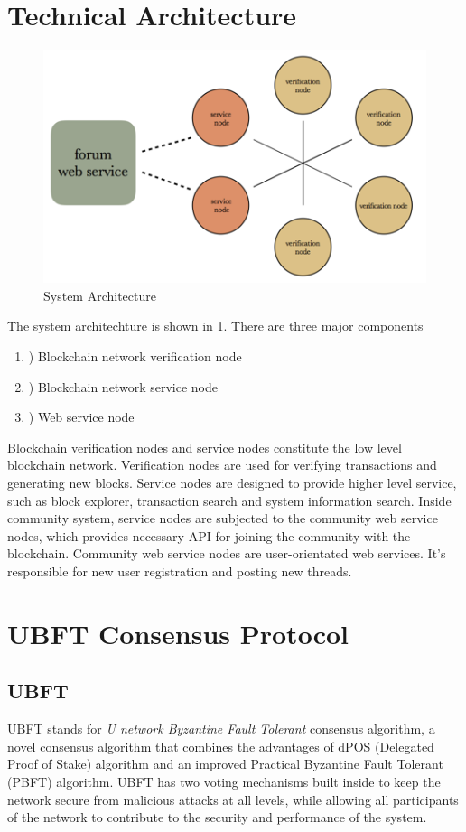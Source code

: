 \section{Technical Architecture}
\begin{figure}
\centering
\includegraphics[width=0.8 \linewidth]{Network.png}
\caption{System Architecture}
\label{fig:system_architecture}
\end{figure}
The system architechture is shown in \ref{fig:system_architecture}. There are three major components
\begin{enumerate}
    \item ) Blockchain network verification node
    \item ) Blockchain network service node
    \item ) Web service node
\end{enumerate}
	
    Blockchain verification nodes and service nodes constitute the low level blockchain network. Verification nodes are used for verifying transactions and generating new blocks. Service nodes are designed to provide higher level service, such as block explorer, transaction search and system information search. Inside community system, service nodes are subjected to the community web service nodes, which provides necessary API for joining the community with the blockchain. Community web service nodes are user-orientated web services. It's responsible for new user registration and posting new threads. 

\section{UBFT Consensus Protocol}

\subsection{UBFT}
    UBFT stands for \emph{U network Byzantine Fault Tolerant} consensus algorithm, a novel consensus algorithm that combines the advantages of dPOS (Delegated Proof of Stake) algorithm and an improved Practical Byzantine Fault Tolerant (PBFT) algorithm\cite{pbft}. UBFT has two voting mechanisms built inside to keep the network secure from malicious attacks at all levels, while allowing all participants of the network to contribute to the security and performance of the system. 

